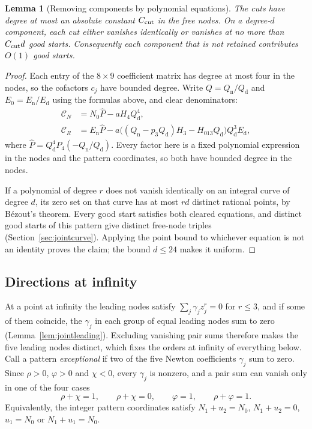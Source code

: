 \documentclass[11pt]{article}
\newtheorem{lemma}[theorem]{Lemma}
\theoremstyle{definition}
\theoremstyle{remark}
\begin{document}
\begin{lemma}[Removing components by polynomial equations]\label{lem:jointcuts}
The cuts have degree at most an absolute constant $C_{\rm cut}$ in the free
nodes. On a degree-$d$ component, each cut either vanishes identically or
vanishes at no more than $C_{\rm cut}d$ good starts. Consequently each
component that is not retained contributes $O(1)$ good starts.
\end{lemma}
\begin{proof}
Each entry of the $8\times9$ coefficient matrix has degree at most four in
the nodes, so the cofactors $c_j$ have bounded degree. Write
$Q=Q_{\mathrm n}/Q_{\mathrm d}$ and $E_0=E_{\mathrm n}/E_{\mathrm d}$ using the
formulas above, and clear denominators:
\begin{align*}
 \mathcal C_N&=N_0\widehat P-aH_4Q_{\mathrm d}^4,\\
 \mathcal C_R&=E_{\mathrm n}\widehat P
 -a\bigl((Q_{\mathrm n}-p_3Q_{\mathrm d})H_3-H_{013}Q_{\mathrm d}\bigr)Q_{\mathrm d}^3E_{\mathrm d},
\end{align*}
where $\widehat P=Q_{\mathrm d}^4P_4(-Q_{\mathrm n}/Q_{\mathrm d})$. Every factor
here is a fixed polynomial expression in the nodes and the pattern
coordinates, so both have bounded degree in the nodes.

If a polynomial of degree $r$ does not vanish identically on an integral
curve of degree $d$, its zero set on that curve has at most $rd$ distinct
rational points, by B\'ezout's theorem. Every good start satisfies both
cleared equations, and distinct good starts of this pattern give distinct
free-node triples (Section~\ref{sec:jointcurve}). Applying the point bound to
whichever equation is not an identity proves the claim; the bound $d\le24$
makes it uniform.
\end{proof}

\subsection{Directions at infinity}\label{sec:jointinfinity}

At a point at infinity the leading nodes satisfy $\sum_j\gamma_jz_j^r=0$ for
$r\le3$, and if some of them coincide, the $\gamma_j$ in each group of equal
leading nodes sum to zero (Lemma~\ref{lem:jointleading}). Excluding vanishing
pair sums therefore makes the five leading nodes distinct, which fixes the
orders at infinity of everything below.
Call a pattern \emph{exceptional} if two of the five Newton coefficients
$\gamma_j$ sum to zero. Since $\rho>0$, $\varphi>0$ and $\chi<0$,
every $\gamma_j$ is nonzero, and a pair sum can vanish only in one of the
four cases
\begin{equation}\label{eq:jointexceptional}
 \rho+\chi=1,\qquad \rho+\chi=0,\qquad \varphi=1,\qquad \rho+\varphi=1.
\end{equation}
Equivalently, the integer pattern coordinates satisfy
$N_1+u_2=N_0$, $N_1+u_2=0$, $u_1=N_0$ or $N_1+u_1=N_0$.
\end{document}
